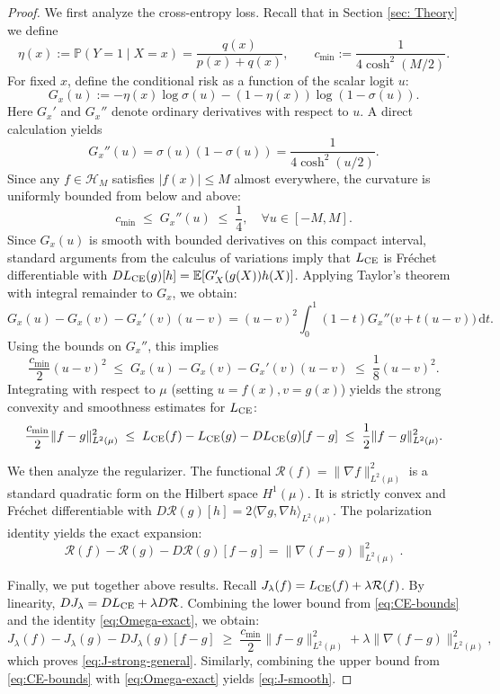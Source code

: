 \documentclass[11pt]{article}
\newcommand{\E}{\mathbb{E}}
\newcommand{\cH}{\mathcal{H}}
\newcommand{\PP}{\mathbb{P}}
\theoremstyle{plain}
\theoremstyle{definition}
\theoremstyle{remark}
\begin{document}
\begin{proof}
We first analyze the cross-entropy loss. Recall that in Section \ref{sec: Theory} we define
\[
  \eta(x):=\PP(Y=1\mid X=x)=\frac{q(x)}{p(x)+q(x)},
  \qquad
  c_{\min}:=\frac{1}{4\cosh^2(M/2)}.
\]
For fixed $x$, define the conditional risk as a function of the scalar logit
$u$:
\[
  G_x(u):=-\eta(x)\log\sigma(u)-(1-\eta(x))\log(1-\sigma(u)).
\]
Here $G_x'$ and $G_x''$ denote ordinary derivatives with respect to $u$.
A direct calculation yields
\[
G_x''(u) = \sigma(u)(1-\sigma(u)) = \frac{1}{4\cosh^2(u/2)}.
\]
Since any $f \in \cH_M$ satisfies $|f(x)| \le M$ almost everywhere, the curvature is uniformly bounded from below and above:
\begin{equation}\label{eq: bounded second derivative}
     c_{\min} \;\le\; G_x''(u) \;\le\; \frac{1}{4}, \quad \forall u \in [-M, M].
\end{equation}
Since $G_x(u)$ is smooth with bounded derivatives on this compact interval, standard arguments from the calculus of variations imply that $L_{\rm CE}$ is Fr\'echet differentiable with $D L_{\rm CE}(g)[h] = \E[G_X'(g(X))h(X)]$.
Applying Taylor's theorem with integral remainder to $G_x$, we obtain:
\[
  G_x(u) - G_x(v) - G_x'(v)(u-v)
  = (u-v)^2 \int_0^1 (1-t) G_x''\big(v+t(u-v)\big)\,\mathrm dt.
\]
Using the bounds on $G_x''$, this implies
\[
  \frac{c_{\min}}{2}(u-v)^2
  \;\le\;
  G_x(u) - G_x(v) - G_x'(v)(u-v)
  \;\le\;
  \frac{1}{8}(u-v)^2.
\]
Integrating with respect to $\mu$ (setting $u=f(x), v=g(x)$) yields the strong convexity and smoothness estimates for $L_{\rm CE}$:
\begin{equation}\label{eq:CE-bounds}
     \frac{c_{\min}}{2}\|f-g\|_{L^2(\mu)}^2
  \;\le\;
  L_{\rm CE}(f)-L_{\rm CE}(g) - D L_{\rm CE}(g)[f-g]
  \;\le\;
  \frac{1}{2}\|f-g\|_{L^2(\mu)}^2.
\end{equation}

We then analyze  the regularizer. The functional $\mathcal{R}(f)=\|\nabla f\|_{L^2(\mu)}^2$ is a standard quadratic form on the Hilbert space $H^1(\mu)$. It is strictly convex and Fr\'echet differentiable with $D\mathcal R(g)[h] = 2\langle \nabla g, \nabla h \rangle_{L^2(\mu)}$. The polarization identity yields the exact expansion:
\begin{equation}\label{eq:Omega-exact}
  \mathcal{R}(f) - \mathcal R(g) - D\mathcal R(g)[f-g] = \|\nabla(f-g)\|_{L^2(\mu)}^2.
\end{equation}

Finally, we put together above results.
Recall $J_\lambda(f) = L_{\rm CE}(f) + \lambda\mathcal{R}(f)$. By linearity, $DJ_\lambda = DL_{\rm CE} + \lambda D\mathcal R$. Combining the lower bound from \eqref{eq:CE-bounds} and the identity \eqref{eq:Omega-exact}, we obtain:
\[
  J_\lambda(f)-J_\lambda(g) - DJ_\lambda(g)[f-g]
  \;\ge\;
  \frac{c_{\min}}{2}\|f-g\|_{L^2(\mu)}^2 + \lambda\|\nabla(f-g)\|_{L^2(\mu)}^2,
\]
which proves \eqref{eq:J-strong-general}. Similarly, combining the upper bound from \eqref{eq:CE-bounds} with \eqref{eq:Omega-exact} yields \eqref{eq:J-smooth}.
\end{proof}
\end{document}
